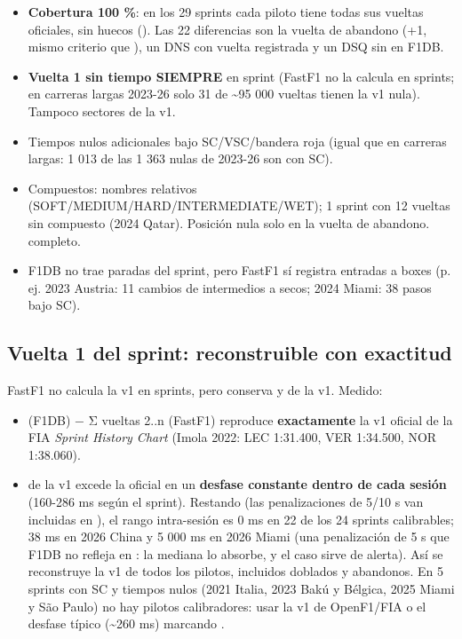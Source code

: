 \begin{itemize}
\item \textbf{Cobertura 100 \%}: en los 29 sprints cada piloto tiene todas sus vueltas oficiales, sin huecos (). Las 22 diferencias son la vuelta de abandono (+1, mismo criterio que ), un DNS con vuelta registrada y un DSQ sin  en F1DB.
\item \textbf{Vuelta 1 sin tiempo SIEMPRE} en sprint (FastF1 no la calcula en sprints; en carreras largas 2023-26 solo 31 de \textasciitilde{}95 000 vueltas tienen la v1 nula). Tampoco sectores de la v1.
\item Tiempos nulos adicionales bajo SC/VSC/bandera roja (igual que en carreras largas: 1 013 de las 1 363 nulas de 2023-26 son con SC).
\item Compuestos: nombres relativos (SOFT/MEDIUM/HARD/INTERMEDIATE/WET); 1 sprint con 12 vueltas sin compuesto (2024 Qatar). Posición nula solo en la vuelta de abandono.  completo.
\item F1DB no trae paradas del sprint, pero FastF1 sí registra entradas a boxes (p. ej. 2023 Austria: 11 cambios de intermedios a secos; 2024 Miami: 38 pasos bajo SC).
\end{itemize}

\subsection{Vuelta 1 del sprint: reconstruible con exactitud}

FastF1 no calcula la v1 en sprints, pero conserva  y  de la v1. Medido:

\begin{itemize}
\item {} (F1DB) − Σ vueltas 2..n (FastF1) reproduce \textbf{exactamente} la v1 oficial de la FIA \emph{Sprint History Chart} (Imola 2022: LEC 1:31.400, VER 1:34.500, NOR 1:38.060).
\item {} de la v1 excede la oficial en un \textbf{desfase constante dentro de cada sesión} (160-286 ms según el sprint). Restando  (las penalizaciones de 5/10 s van incluidas en ), el rango intra-sesión es 0 ms en 22 de los 24 sprints calibrables; 38 ms en 2026 China y 5 000 ms en 2026 Miami (una penalización de 5 s que F1DB no refleja en : la mediana lo absorbe, y el caso sirve de alerta). Así se reconstruye la v1 de todos los pilotos, incluidos doblados y abandonos. En 5 sprints con SC y tiempos nulos (2021 Italia, 2023 Bakú y Bélgica, 2025 Miami y São Paulo) no hay pilotos calibradores: usar la v1 de OpenF1/FIA o el desfase típico (\textasciitilde{}260 ms) marcando .
\end{itemize}

